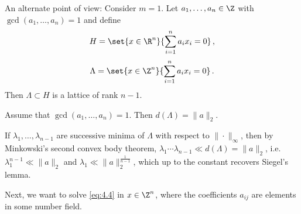 An alternate point of view: Consider \( m=1 \).
Let \( a_1, \dotsc, a_n \in \Z \) with \( \gcd(a_1, \dotsc, a_n) = 1 \) and define
\[ H = \set{x \in \R^n}{\sum_{i=1}^{n} a_ix_i = 0} \,, \]
\[ \Lambda = \set{x \in \Z^n}{\sum_{i=1}^{n} a_ix_i = 0} \,. \]
Then \( \Lambda \subset H \) is a lattice of rank \( n-1 \).

\begin{lem}
	Assume that \( \gcd(a_1, \dotsc, a_n)=1 \).
	Then \( d(\Lambda) = \|a\|_2 \).
\end{lem}

If \( \lambda_1, \dotsc, \lambda_{n-1} \) are successive minima of \( \Lambda \) with respect to \( \|\cdot\|_\infty \), then by Minkowski's second convex body theorem, \( \lambda_1 \dotsm \lambda_{n-1} \ll  d(\Lambda) = \|a\|_2 \), i.e. \( \lambda_1^{n-1} \ll \|a\|_2\) and \( \lambda_1 \ll \|a\|_2^\frac{1}{n-1} \), which up to the constant recovers Siegel's lemma.

Next, we want to solve \eqref{eq:4.4} in \( x \in \Z^n \), where the coefficients \( a_{ij} \) are elements in some number field.

